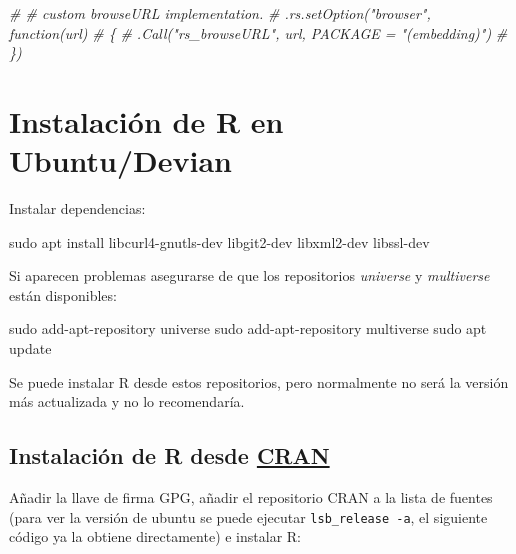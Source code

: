 \documentclass[
]{book}
\newenvironment{Shaded}{\begin{snugshade}}{\end{snugshade}}
\newcommand{\CommentTok}[1]{\textcolor[rgb]{0.56,0.35,0.01}{\textit{#1}}}
\newcommand{\FunctionTok}[1]{\textcolor[rgb]{0.00,0.00,0.00}{#1}}
\newcommand{\NormalTok}[1]{#1}
\theoremstyle{break}
\theoremstyle{nonumberplain}
\begin{document}
\begin{Shaded}
\begin{Highlighting}[]
\CommentTok{\# \# custom browseURL implementation.}
\CommentTok{\# .rs.setOption("browser", function(url)}
\CommentTok{\# \{}
   \CommentTok{\# .Call("rs\_browseURL", url, PACKAGE = "(embedding)")}
\CommentTok{\# \})}
\end{Highlighting}
\end{Shaded}

\hypertarget{ubuntu}{%
\section{Instalación de R en Ubuntu/Devian}\label{ubuntu}}

Instalar dependencias:

\begin{Shaded}
\begin{Highlighting}[]
\FunctionTok{sudo}\NormalTok{ apt install libcurl4{-}gnutls{-}dev libgit2{-}dev libxml2{-}dev libssl{-}dev }
\end{Highlighting}
\end{Shaded}

Si aparecen problemas asegurarse de que los repositorios \emph{universe} y \emph{multiverse} están disponibles:

\begin{Shaded}
\begin{Highlighting}[]
\FunctionTok{sudo}\NormalTok{ add{-}apt{-}repository universe}
\FunctionTok{sudo}\NormalTok{ add{-}apt{-}repository multiverse}
\FunctionTok{sudo}\NormalTok{ apt update}
\end{Highlighting}
\end{Shaded}

Se puede instalar R desde estos repositorios, pero normalmente no será la versión más actualizada y no lo recomendaría.

\hypertarget{instalaciuxf3n-de-r-desde-cran}{%
\subsection{\texorpdfstring{Instalación de R desde \href{https://cran.r-project.org/bin/linux/ubuntu}{CRAN}}{Instalación de R desde CRAN}}\label{instalaciuxf3n-de-r-desde-cran}}

Añadir la llave de firma GPG, añadir el repositorio CRAN a la lista de fuentes (para ver la versión de ubuntu se puede ejecutar \texttt{lsb\_release\ -a}, el siguiente código ya la obtiene directamente) e instalar R:
\end{document}
